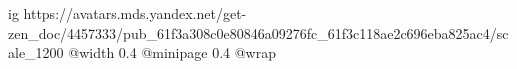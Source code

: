  
 
 
 
 

\ifcmt
  ig https://avatars.mds.yandex.net/get-zen_doc/4457333/pub_61f3a308c0e80846a09276fc_61f3c118ae2c696eba825ac4/scale_1200
  @width 0.4
  @minipage 0.4
  @wrap \parpic[r]
\fi
